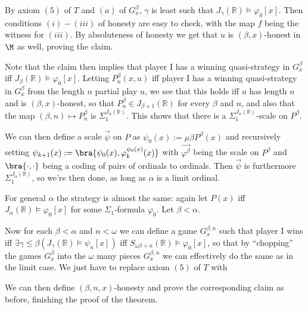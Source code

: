 {{	\qquad By axiom $(5)$ of $T$ and $(a)$ of $G_x^\beta$, $\gamma$ is least such that $J_\gamma(\mathbb R)\models\varphi_0[x]$. Then conditions $(i)-(iii)$ of honesty are easy to check, with the map $f$ being the witness for $(iii)$. By absoluteness of honesty we get that $u$ is $(\beta,x)$-honest in$ \M$ as well, proving the claim.
}

Note that the claim then implies that player I has a winning quasi-strategy in $G_x^\beta$ iff $J_\beta(\mathbb R)\models\varphi_0[x]$. Letting $P_n^\beta(x,u)$ iff player I has a winning quasi-strategy in $G_x^\beta$ from the length $n$ partial play $u$, we see that this holds iff $u$ has length $n$ and is $(\beta,x)$-honest, so that $P_n^\beta\in J_{\beta+1}(\mathbb R)$ for every $\beta$ and $n$, and also that the map $(\beta,n)\mapsto P_n^\beta$ is $\Sigma_1^{J_\alpha(\mathbb R)}$. This shows that there is a $\Sigma_1^{J_\alpha(\mathbb R)}$-scale on $P^\beta$.

\qquad We can then define a scale $\vec\psi$ on $P$ as $\psi_0(x):=\mu\beta P^\beta(x)$ and recursively setting $\psi_{k+1}(x):=\bra{\psi_0(x),\varphi_k^{\psi_0(x)}(x)}$ with $\vec{\varphi^\beta}$ being the scale on $P^\beta$ and $\bra{\cdot,\cdot}$ being a coding of pairs of ordinals to ordinals. Then $\vec\psi$ is furthermore $\Sigma_1^{J_\alpha(\mathbb R)}$, so we're then done, as long as $\alpha$ is a limit ordinal.

\qquad For general $\alpha$ the strategy is almost the same: again let $P(x)$ iff $J_\alpha(\mathbb R)\models\varphi_0[x]$ for some $\Sigma_1$-formula $\varphi_0$. Let $\beta<\alpha$.



Now for each $\beta<\alpha$ and $n<\omega$ we can define a game $G_x^{\beta,n}$ such that player I wins iff $\exists\gamma\leq\beta(J_\gamma(\mathbb R)\models\psi_n[x])$ iff $S_{\omega\beta+n}(\mathbb R)\models\varphi_0[x]$, so that by ``chopping'' the games $G_x^\beta$ into the $\omega$ many pieces $G_x^{\beta,n}$ we can effectively do the same as in the limit case. We just have to replace axiom $(5)$ of $T$ with

We can then define $(\beta,n,x)$-honesty and prove the corresponding claim as before, finishing the proof of the theorem.
}

